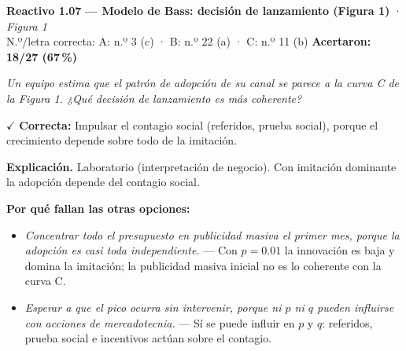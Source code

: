 \documentclass[10pt,letterpaper]{article}
\begin{document}
\begin{minipage}{\textwidth}
{\color{guinda}\textbf{Reactivo 1.07}} \textbf{— Modelo de Bass: decisión de lanzamiento (Figura 1)} · \textit{Figura 1}\\[-1pt]
{\scriptsize N.º/letra correcta: A: n.º 3 (c) · B: n.º 22 (a) · C: n.º 11 (b) \hfill \textbf{Acertaron: 18/27 (67\,\%)}}

\textit{Un equipo estima que el patrón de adopción de su canal se parece a la curva C de la Figura 1. ¿Qué decisión de lanzamiento es más coherente?}

\textcolor{verde}{$\checkmark$} \textbf{Correcta:} Impulsar el contagio social (referidos, prueba social), porque el crecimiento depende sobre todo de la imitación.

\textbf{Explicación.} Laboratorio (interpretación de negocio). Con imitación dominante la adopción depende del contagio social.

\textbf{Por qué fallan las otras opciones:}
\begin{itemize}[itemsep=0pt,topsep=1pt,leftmargin=1.3em,parsep=0pt]
\item[\textcolor{rojo}{$\times$}] \textit{Concentrar todo el presupuesto en publicidad masiva el primer mes, porque la adopción es casi toda independiente.} --- Con $p=0.01$ la innovación es baja y domina la imitación; la publicidad masiva inicial no es lo coherente con la curva C.
\item[\textcolor{rojo}{$\times$}] \textit{Esperar a que el pico ocurra sin intervenir, porque ni $p$ ni $q$ pueden influirse con acciones de mercadotecnia.} --- Sí se puede influir en $p$ y $q$: referidos, prueba social e incentivos actúan sobre el contagio.
\end{itemize}
\end{minipage}\par\vspace{5pt}{\color{gray!40}\hrule}\vspace{5pt}
\end{document}
